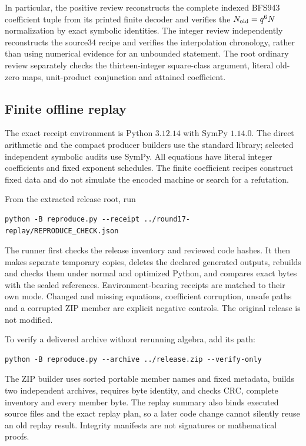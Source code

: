 \documentclass[11pt]{article}
\begin{document}
In particular, the positive review reconstructs the complete indexed BFS943
coefficient tuple from its printed finite decoder and verifies the
$N_{\rm old}=q^6N$ normalization by exact symbolic identities.
The integer review independently reconstructs the source34 recipe and
verifies the interpolation chronology, rather than using numerical evidence
for an unbounded statement. The root ordinary review separately checks the
thirteen-integer square-class argument, literal old-zero maps, unit-product
conjunction and attained coefficient.

\subsection{Finite offline replay}
The exact receipt environment is Python $3.12.14$ with SymPy $1.14.0$.
The direct arithmetic and the compact producer builders use the standard
library; selected independent symbolic audits use SymPy. All equations have
literal integer coefficients and fixed exponent schedules. The finite
coefficient recipes construct fixed data and do not simulate the encoded
machine or search for a refutation.

From the extracted release root, run
\begin{verbatim}
python -B reproduce.py --receipt ../round17-replay/REPRODUCE_CHECK.json
\end{verbatim}
The runner first checks the release inventory and reviewed code hashes.
It then makes separate temporary copies, deletes the declared generated
outputs, rebuilds and checks them under normal and optimized Python, and
compares exact bytes with the sealed references. Environment-bearing
receipts are matched to their own mode. Changed and missing equations,
coefficient corruption, unsafe paths and a corrupted ZIP member are explicit
negative controls. The original release is not modified.

To verify a delivered archive without rerunning algebra, add its path:
\begin{verbatim}
python -B reproduce.py --archive ../release.zip --verify-only
\end{verbatim}
The ZIP builder uses sorted portable member names and fixed metadata,
builds two independent archives, requires byte identity, and checks CRC,
complete inventory and every member byte. The replay summary also binds
executed source files and the exact replay plan, so a later code change
cannot silently reuse an old replay result. Integrity manifests are not
signatures or mathematical proofs.
\end{document}
